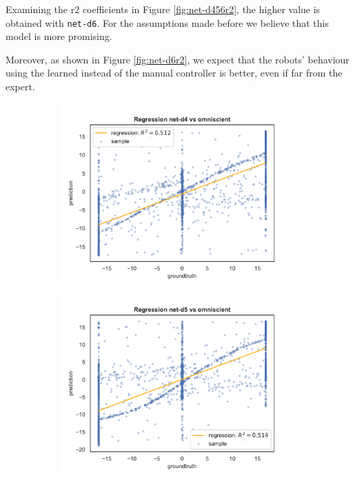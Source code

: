 Examining the \gls{r2} coefficients in Figure \ref{fig:net-d456r2}, the higher 
value is obtained with \texttt{net-d6}. For the assumptions made before we 
believe that this model is more promising. 

Moreover, as shown in Figure \ref{fig:net-d6r2}, we expect that the robots’ 
behaviour using the learned instead of the manual controller is better, even if far 
from the expert.

\begin{figure}[!htb]
	\begin{center}
		\begin{subfigure}[h]{0.49\textwidth}
			\includegraphics[width=\textwidth]{contents/images/net-d4/regression-net-d4-vs-omniscient}%
		\end{subfigure}
		\hfill\vspace{-0.5cm}
		\begin{subfigure}[h]{0.49\textwidth}
			\includegraphics[width=\textwidth]{contents/images/net-d5/regression-net-d5-vs-omniscient}%

\end{subfigure}
\end{center}
\end{figure}
